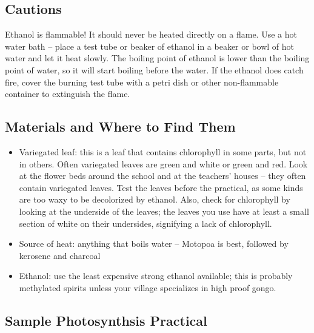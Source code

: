\subsection{Cautions}
Ethanol is flammable! It should never be heated directly on a flame. Use a hot water bath -- place a test tube or beaker of ethanol in a beaker or bowl of hot water and let it heat slowly. The boiling point of ethanol is lower than the boiling point of water, so it will start boiling before the water. If the ethanol does catch fire, cover the burning test tube with a petri dish or other non-flammable container to extinguish the flame.

\subsection{Materials and Where to Find Them}
\begin{itemize}
\item{Variegated leaf: this is a leaf that contains chlorophyll in some parts, but not in others. Often variegated leaves are green and white or green and red. Look at the flower beds around the school and at the teachers’ houses -- they often contain variegated leaves. Test the leaves before the practical, as some kinds are too waxy to be decolorized by ethanol. Also, check for chlorophyll by looking at the underside of the leaves; the leaves you use have at least a small section of white on their undersides, signifying a lack of chlorophyll.}
\item{Source of heat: anything that boils water – Motopoa is best, followed by kerosene and charcoal}
\item{Ethanol: use the least expensive strong ethanol available; this is probably methylated spirits unless your village specializes in high proof gongo.}
\end{itemize}

\subsection{Sample Photosynthsis Practical}

